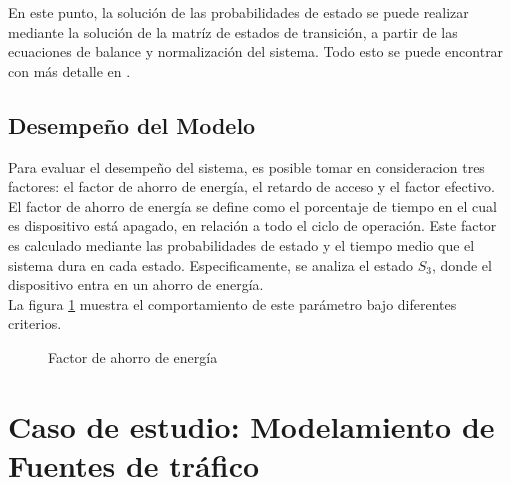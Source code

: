 \documentclass[journal]{IEEEtran}
\begin{document}
En este punto, la solución de las probabilidades de estado se puede realizar mediante la solución de la matríz de estados de transición, a partir de las ecuaciones de balance y normalización del sistema. Todo esto se puede encontrar con más detalle en \cite{paper2}.

\subsection{Desempeño del Modelo}

Para evaluar el desempeño del sistema, es posible tomar en consideracion tres factores: el factor de ahorro de energía, el retardo de acceso y el factor efectivo.\\

El factor de ahorro de energía se define como el porcentaje de tiempo en el cual es dispositivo está apagado, en relación a todo el ciclo de operación. Este factor es calculado mediante las probabilidades de estado y el tiempo medio que el sistema dura en cada estado. Especificamente, se analiza el estado $S_{3}$, donde el dispositivo entra en un ahorro de energía.\\

La figura \ref{ps} muestra el comportamiento de este parámetro bajo diferentes criterios.

\begin{figure}[h]
\centering
{}
\caption{Factor de ahorro de energía}
\label{ps}
\end{figure}


\section{Caso de estudio: Modelamiento de Fuentes de tráfico}
\end{document}
